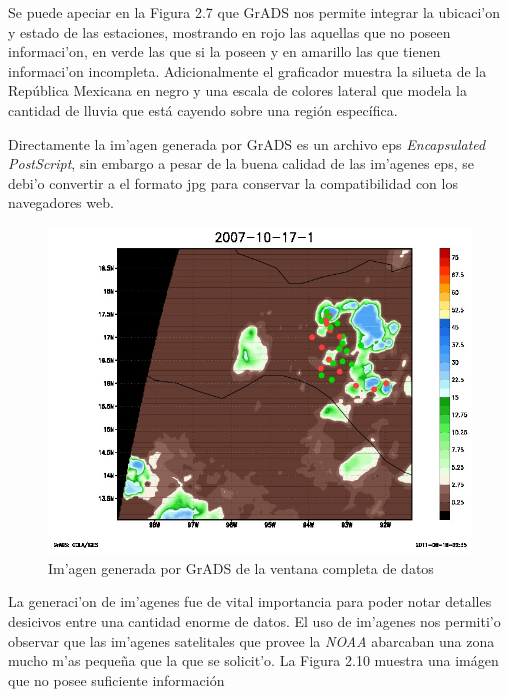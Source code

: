 Se puede apeciar en la Figura 2.7 que GrADS nos permite integrar la ubicaci'on y estado de las estaciones,
mostrando en rojo las aquellas que no poseen informaci'on, en verde las que si la poseen y en amarillo las que 
tienen informaci'on incompleta. Adicionalmente el graficador muestra la silueta de la Rep\'ublica Mexicana en negro y una escala de colores
lateral que modela la cantidad de lluvia que est\'a cayendo sobre una regi\'on espec\'ifica.

Directamente la im'agen generada por GrADS es un archivo eps \textit{Encapsulated PostScript}, sin embargo a pesar de la buena calidad
de las im'agenes eps, se debi'o convertir a el formato jpg para conservar la compatibilidad con los navegadores web.

\begin{figure}[h!]
 \centering
 \includegraphics[width=130mm]{./imagenes/2007_10_17_1.jpg}
 \caption{Im'agen generada por GrADS de la ventana completa de datos}
\end{figure}

La generaci'on de im'agenes fue de vital importancia para poder notar detalles desicivos entre una cantidad enorme de datos.
El uso de im'agenes nos permiti'o observar que las im'agenes satelitales que provee la \textit{NOAA} abarcaban una zona mucho
m'as peque\~na que la que se solicit'o. La Figura 2.10 muestra una im\'agen que no posee suficiente informaci\'on

